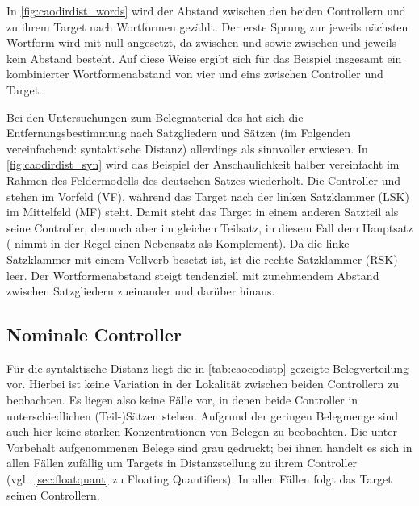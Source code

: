 In \cref{fig:caodirdist_words} wird der Abstand zwischen den beiden Controllern
 und   zu ihrem Target
  nach Wortformen gezählt. Der erste Sprung zur jeweils
nächsten Wortform wird mit null angesetzt, da zwischen  und
  sowie zwischen   und
  jeweils kein Abstand besteht. Auf
diese Weise ergibt sich für das Beispiel insgesamt ein kombinierter Wortformenabstand von vier und
eins zwischen Controller und Target.

Bei den Untersuchungen zum Belegmaterial des \CAO{} hat sich die
Entfernungsbestimmung nach Satzgliedern und Sätzen (im Folgenden vereinfachend:
syntaktische Distanz) allerdings als sinnvoller erwiesen. In
\cref{fig:caodirdist_syn} wird das Beispiel der Anschaulichkeit halber
vereinfacht im Rahmen des Feldermodells des deutschen Satzes
\autocites{drach1963}{woellstein2010}[vgl.\ auch][43--51]{mueller2020}
wiederholt. Die Controller  und  
stehen im Vorfeld (VF), während das Target   nach der
linken Satzklammer (LSK) im Mittelfeld (MF) steht. Damit steht das Target in
einem anderen Satzteil als seine Controller, dennoch aber im gleichen Teilsatz,
in diesem Fall dem Hauptsatz (  nimmt
in der Regel einen Nebensatz als Komplement). Da die linke Satzklammer mit
einem Vollverb besetzt ist, ist die rechte Satzklammer (RSK) leer. Der
Wortformenabstand steigt tendenziell mit zunehmendem Abstand zwischen
Satzgliedern zueinander und darüber hinaus.

\subsection{Nominale Controller}
\label{subsec:caodistnomctrl}

Für die syntaktische Distanz liegt die in \cref{tab:caocodistp} gezeigte
Belegverteilung vor. Hierbei ist keine Variation in der Lokalität zwischen
beiden Controllern zu beobachten. Es liegen also keine Fälle vor, in denen
beide Controller in unterschiedlichen (Teil-)Sätzen stehen. Aufgrund der
geringen Belegmenge sind auch hier keine starken Konzentrationen von Belegen zu
beobachten. Die unter Vorbehalt aufgenommenen Belege sind grau gedruckt; bei
ihnen handelt es sich in allen Fällen zufällig um Targets in Distanzstellung zu
ihrem Controller (vgl.~\cref{sec:floatquant} zu Floating Quantifiers). In allen
Fällen folgt das Target seinen Controllern.

